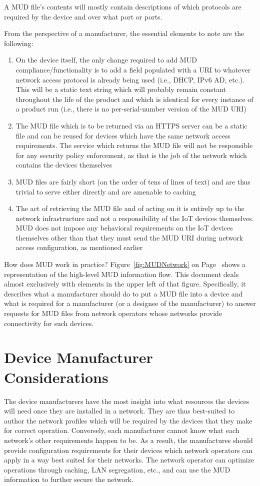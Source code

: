 \documentclass[conference]{IEEEtran}
\begin{document}
A MUD file's contents will mostly contain descriptions of which
protocols are required by the device and over what port or ports.

From the perspective of a manufacturer, the essential elements to note
are the following:
\begin{enumerate}
\item On the device itself, the only change required to add MUD
  compliance/functionality is to add a field populated with a URI to
  whatever network access protocol is already being used (i.e., DHCP,
  IPv6 AD, etc.).  This will be a static text string which will
  probably remain constant throughout the life of the product and
  which is identical for every instance of a product run (i.e., there
  is no per-serial-number version of the MUD URI)
\item The MUD file which is to be returned via an HTTPS server can be
  a static file and can be reused for devices which have the same
  network access requirements.  The service which returns the MUD file
  will not be responsible for any security policy enforcement, as that
  is the job of the network which contains the devices themselves
\item MUD files are fairly short (on the order of tens of lines of
  text) and are thus trivial to serve either directly and are amenable
  to caching
\item The act of retrieving the MUD file and of acting on it is
  entirely up to the network infrastructure and not a responsibility
  of the IoT devices themselves.  MUD does not impose any behavioral
  requirements on the IoT devices themselves other than that they must
  send the MUD URI during network access configuration, as mentioned
  earlier
\end{enumerate}

How does MUD work in practice?  Figure~\ref{fig:MUDNetwork} on
Page~\pageref{fig:MUDNetwork} shows a
representation of the high-level MUD information flow.
This document deals almost exclusively with elements in the upper left
of that figure.  Specifically, it describes what a manufacturer should
do to put a MUD file into a device and what is required for a
manufacturer (or a designee of the manufacturer) to answer requests
for MUD files from network operators whose networks provide
connectivity for such devices.


\section{Device Manufacturer Considerations}
The device manufacturers have the most insight into what resources the
devices will need once they are installed in a network.  They are thus
best-suited to author the network profiles which will be required by
the devices that they make for correct operation.  Conversely, each
manufacturer cannot know what each network's other requirements happen
to be.  As a result, the manufactures should provide configuration
requirements for their devices which network operators can apply in a
way best suited for their networks.  The network operator can optimize
operations through caching, LAN segregation, etc., and can use the MUD
information to further secure the network.
\end{document}
